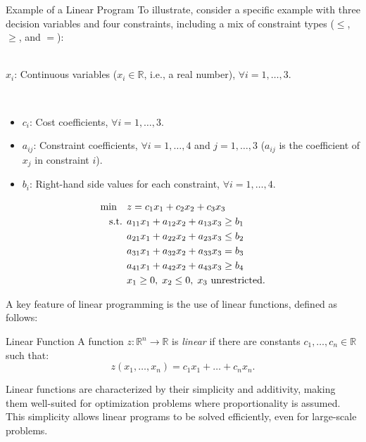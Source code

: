 \begin{example}{Example of a Linear Program}{}
To illustrate, consider a specific example with three decision variables and four constraints, including a mix of constraint types ($\leq$, $\geq$, and $=$):

\smallskip {}\\
$x_i$: Continuous variables ($x_i \in \mathbb{R}$, i.e., a real number), $\forall i = 1,\dots,3$.

\smallskip {}\\
\begin{itemize}
    \item $c_i$: Cost coefficients, $\forall i = 1,\dots,3$.
    \item $a_{ij}$: Constraint coefficients, $\forall i = 1,\dots,4$ and $j = 1,\dots,3$ ($a_{ij}$ is the coefficient of $x_j$ in constraint $i$).
    \item $b_i$: Right-hand side values for each constraint, $\forall i = 1,\dots,4$.
\end{itemize}

\smallskip {}
\begin{align*}
\min \quad & z = c_1x_1 + c_2x_2 + c_3x_3 \\
\mbox{ s.t. }        & a_{11}x_1 + a_{12}x_2 + a_{13}x_3 \geq b_1 \\
& a_{21}x_1 + a_{22}x_2 + a_{23}x_3 \leq b_2 \\
& a_{31}x_1 + a_{32}x_2 + a_{33}x_3 = b_3 \\
& a_{41}x_1 + a_{42}x_2 + a_{43}x_3 \geq b_4 \\
& x_1 \geq 0, \; x_2 \leq 0, \; x_3 \mbox{ unrestricted.}
\end{align*}
\end{example}

A key feature of linear programming is the use of linear functions, defined as follows:

\begin{definition}{Linear Function}\label{def:linearfunction}
A function $z: \mathbb{R}^n \rightarrow \mathbb{R}$ is \textit{linear} if there are constants $c_1, \dots, c_n \in \mathbb{R}$ such that:
\begin{equation}
z(x_1, \dots, x_n) = c_1x_1 + \dots + c_nx_n.
\end{equation}
\label{def:LinearFunc}
\end{definition}

Linear functions are characterized by their simplicity and additivity, making them well-suited for optimization problems where proportionality is assumed. This simplicity allows linear programs to be solved efficiently, even for large-scale problems.

